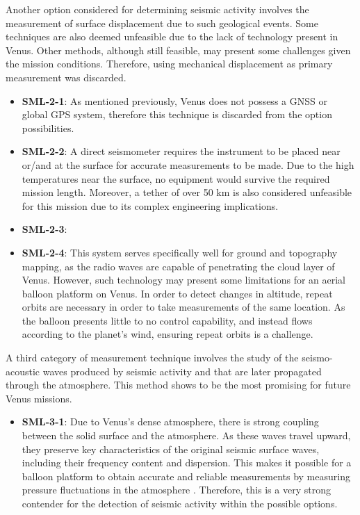 Another option considered for determining seismic activity involves the measurement of surface displacement due to such geological events. Some techniques are also deemed unfeasible due to the lack of technology present in Venus. Other methods, although still feasible, may present some challenges given the mission conditions. Therefore, using mechanical displacement as primary measurement was discarded. 
\begin{itemize}
    \item \textbf{SML-2-1}: As mentioned previously, Venus does not possess a GNSS or global GPS system, therefore this technique is discarded from the option possibilities. 
    \item \textbf{SML-2-2}: A direct seismometer requires the instrument to be placed near or/and at the surface for accurate measurements to be made. Due to the high temperatures near the surface, no equipment would survive the required mission length. Moreover, a tether of over 50 km is also considered unfeasible for this mission due to its complex engineering implications. 
    \item \textbf{SML-2-3}: 
    \item \textbf{SML-2-4}: This system serves specifically well for ground and topography mapping, as the radio waves are capable of penetrating the cloud layer of Venus. However, such technology may present some limitations for an aerial balloon platform on Venus. In order to detect changes in altitude, repeat orbits are necessary in order to take measurements of the same location. As the balloon presents little to no control capability, and instead flows according to the planet's wind, ensuring repeat orbits is a challenge. 
\end{itemize}

A third category of measurement technique involves the study of the seismo-acoustic waves produced by seismic activity and that are later propagated through the atmosphere. This method shows to be the most promising for future Venus missions. 

\begin{itemize}
    \item \textbf{SML-3-1}: Due to Venus’s dense atmosphere, there is strong coupling between the solid surface and the atmosphere. As these waves travel upward, they preserve key characteristics of the original seismic surface waves, including their frequency content and dispersion. This makes it possible for a balloon platform to obtain accurate and reliable measurements by measuring pressure fluctuations in the atmosphere \cite{SML-3-2}. Therefore, this is a very strong contender for the detection of seismic activity within the possible options. 
\end{itemize}


